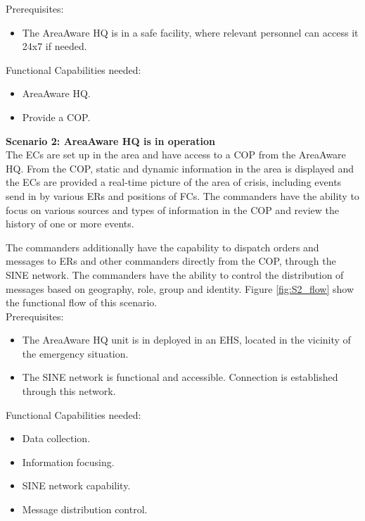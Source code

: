 \noindent Prerequisites:
\begin{itemize}
	\item The AreaAware HQ is in a safe facility, where relevant personnel can access it 24x7 if needed.
\end{itemize}

\noindent Functional Capabilities needed:
\begin{itemize}
	\itemsep0em
	\item AreaAware HQ.
	\item Provide a COP.
\end{itemize}


\newpage
\noindent \textbf{Scenario 2: AreaAware HQ is in operation} \\
The ECs are set up in the area and have access to a COP from the AreaAware HQ.
From the COP, static and dynamic information in the area is displayed and the ECs are provided a real-time picture of the area of crisis, including events send in by various ERs and positions of FCs.
The commanders have the ability to focus on various sources and types of information in the COP and review the history of one or more events. 

The commanders additionally have the capability to dispatch orders and messages to ERs and other commanders directly from the COP, through the SINE network. The commanders have the ability to control the distribution of messages based on geography, role, group and identity. Figure \ref{fig:S2_flow} show the functional flow of this scenario. \\

\noindent Prerequisites:
\begin{itemize}
	\itemsep0em
	\item The AreaAware HQ unit is in deployed in an EHS, located in the vicinity of the emergency situation.
	\item The SINE network is functional and accessible. Connection is established through this network.
\end{itemize}

\noindent Functional Capabilities needed:
\begin{itemize}
	\itemsep0em
	\item Data collection.
	\item Information focusing.
	\item SINE network capability.
	\item Message distribution control.
\end{itemize}

